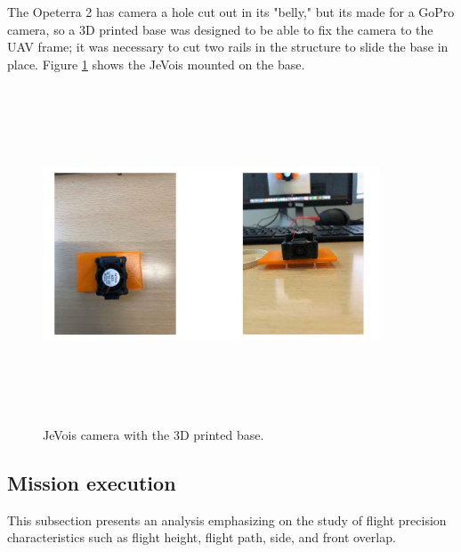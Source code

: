 The Opeterra 2 has camera a hole cut out in its "belly," but its made for a GoPro camera, so a 3D printed base was designed to be able to fix the camera to the UAV frame; it was necessary to cut two rails in the structure to slide the base in place. Figure \ref{fig:base} shows the JeVois mounted on the base.
\begin{figure}[H]
\centering
\includegraphics[width=10cm,height=10cm,keepaspectratio]{imagenes/Base.jpg}
\caption{JeVois camera with the 3D printed base.}
\label{fig:base}
\end{figure}
\subsection{Mission execution}
This subsection presents an analysis emphasizing on the study of flight precision characteristics such as flight height, flight path, side, and front overlap. 
